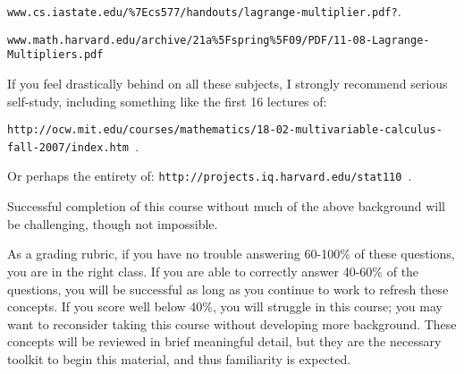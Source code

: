 \documentclass[]{../util/ColumbiaAssm}
\begin{document}
{\tt \footnotesize www.cs.iastate.edu/\%7Ecs577/handouts/lagrange-multiplier.pdf?}.

{\tt \footnotesize www.math.harvard.edu/archive/21a\%5Fspring\%5F09/PDF/11-08-Lagrange-Multipliers.pdf}

If you feel drastically behind on all these subjects, I strongly recommend serious self-study, including something like the first 16 lectures of: 
 
{\tt \footnotesize http://ocw.mit.edu/courses/mathematics/18-02-multivariable-calculus-fall-2007/index.htm }.

Or perhaps the entirety of:  {\tt \footnotesize http://projects.iq.harvard.edu/stat110 }.

Successful completion of this course without much of the above background will be challenging, though not impossible.


As a grading rubric, if you have no trouble answering 60-100\% of these questions, you are in the right class.  If you are able to correctly answer 40-60\% of the questions, you will be successful as long as you continue to work to refresh these concepts.  If you score well below 40\%, you will struggle in this course; you may want to reconsider taking this course without developing more background.     These concepts will be reviewed in brief meaningful detail, but they are the necessary toolkit to begin this material, and thus familiarity is expected.  
\end{document}
